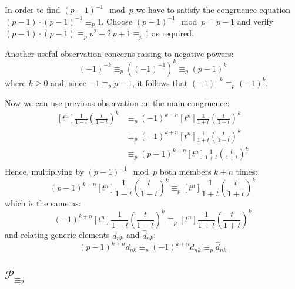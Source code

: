 In order to find $(p-1)^{-1}\mod p$ we have to satisfy the
congruence equation $(p-1) \cdot (p-1)^{-1} \equiv_{p} 1$. Choose
$(p-1)^{-1}\mod p = p-1$ and verify
$(p-1) \cdot (p-1) \equiv_{p} p^{2} -2\,p +1 \equiv_{p} 1$ as required.

Another useful observation concerns raising to negative powers:
\begin{displaymath}
    (-1)^{-k} \equiv_{p} \left((-1)^{-1}\right)^{k} \equiv_{p} (p-1)^k
\end{displaymath}
where $k \geq 0$ and, since $-1 \equiv_{p} p-1$, it follows that
$(-1)^{-k} \equiv_{p} (-1)^k$.

Now we can use previous observation on the main congruence:
\begin{displaymath}
    \begin{split}
        [t^n]\frac{1}{1-t}\left(\frac{t}{1-t}\right)^k 
            &\equiv_{p} (-1)^{k-n}[t^n]\frac{1}{1+t}\left(\frac{t}{1+t}\right)^k \\
            &\equiv_{p} (-1)^{k+n}[t^n]\frac{1}{1+t}\left(\frac{t}{1+t}\right)^k \\
            &\equiv_{p} (p-1)^{k+n}[t^n]\frac{1}{1+t}\left(\frac{t}{1+t}\right)^k \\
    \end{split}
\end{displaymath}
Hence, multiplying by $(p-1)^{-1}\mod p$ both members $k+n$ times:
\begin{displaymath}
    (p-1)^{k+n}[t^n]\frac{1}{1-t}\left(\frac{t}{1-t}\right)^k \equiv_{p} [t^n]\frac{1}{1+t}\left(\frac{t}{1+t}\right)^k 
\end{displaymath}
which is the same as:
\begin{displaymath}
    (-1)^{k+n}[t^n]\frac{1}{1-t}\left(\frac{t}{1-t}\right)^k \equiv_{p} [t^n]\frac{1}{1+t}\left(\frac{t}{1+t}\right)^k 
\end{displaymath}
and relating generic elements $d_{nk}$ and $\hat{d}_{nk}$:
\begin{equation}
    \label{eq:general:congruence:over:pascal:arrays}
    (p-1)^{k+n}d_{nk}\equiv_{p}(-1)^{k+n}d_{nk} \equiv_{p} \hat{d}_{nk}
\end{equation}

\subsection{$\mathcal{P}_{\equiv_{2}}$} 

